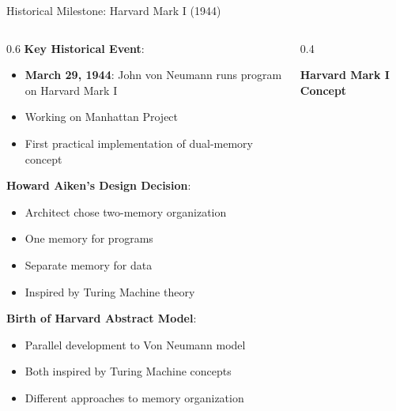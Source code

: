 \documentclass[aspectratio=169]{beamer}
\newcommand{\concept}[1]{\textbf{\color{darkblue}#1}}
\begin{document}
\begin{frame}{Historical Milestone: Harvard Mark I (1944)}
\begin{columns}
\begin{column}{0.6\textwidth}
\concept{Key Historical Event}:
\begin{itemize}
\item \textbf{March 29, 1944}: John von Neumann runs program on Harvard Mark I
\item Working on Manhattan Project
\item First practical implementation of dual-memory concept
\end{itemize}

\vspace{0.3cm}
\concept{Howard Aiken's Design Decision}:
\begin{itemize}
\item Architect chose two-memory organization
\item One memory for programs
\item Separate memory for data
\item Inspired by Turing Machine theory
\end{itemize}

\vspace{0.3cm}
\concept{Birth of Harvard Abstract Model}:
\begin{itemize}
\item Parallel development to Von Neumann model
\item Both inspired by Turing Machine concepts
\item Different approaches to memory organization
\end{itemize}
\end{column}
\begin{column}{0.4\textwidth}
\begin{center}
\textbf{Harvard Mark I Concept}
\vspace{0.3cm}

\end{center}
\end{column}
\end{columns}
\end{frame}
\end{document}
